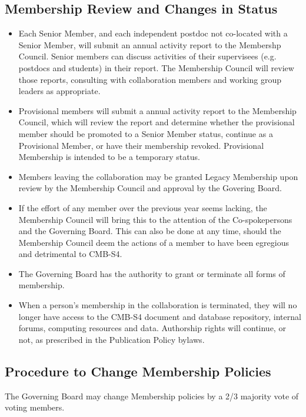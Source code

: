\subsection{Membership Review and Changes in Status}
\begin{itemize} 

\item Each Senior Member, and each independent postdoc not co-located with a Senior Member, will submit an annual activity report to the Membershp Council.  Senior members can discuss activities of their supervisees (e.g. postdocs and students) in their report. The Membership Council will review those reports, consulting with collaboration members and working group leaders as appropriate.

\item Provisional members will submit a annual activity report to the Membership Council, which will review the report and determine whether the provisional member should be promoted to a Senior Member status, continue as a Provisional Member, or have their membership revoked.  Provisional Membership is intended to be a temporary status.

\item Members leaving the collaboration may be granted Legacy Membership upon review by the Membership Council and approval by the Govering Board.

\item If the effort of any member over the previous year seems lacking, the Membership Council will bring this to the attention of the Co-spokepersons and the Governing Board.  This can also be done at any time, should the Membership Council deem the actions of a member to have been egregious and detrimental to CMB-S4.

\item The Governing Board has the authority to grant or terminate all forms of membership.

\item When a person's membership in the collaboration is terminated, they will no longer have access to the CMB-S4 document and database repository, internal forums, computing resources and data.  Authorship rights will continue, or not, as prescribed in the Publication Policy bylaws.


\end{itemize}

\subsection{Procedure to Change Membership Policies}

The Governing Board may change Membership policies by a 2/3 majority vote of voting members.

